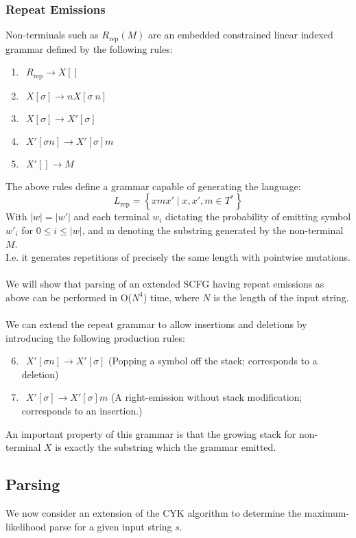 \documentclass[11pt]{article}
\begin{document}
\subsubsection {Repeat Emissions}
Non-terminals such as $R_\text{rep}(M)$ are an embedded constrained linear indexed grammar
defined by the following rules:
\begin{enumerate}
\item $\ \ R_\text{rep} \rightarrow X[]$
\item $\ \ X[\sigma] \rightarrow n X[\sigma \ n]$
\item $\ \ X[\sigma] \rightarrow X'[\sigma]$
\item $\ \ X'[\sigma n] \rightarrow X'[\sigma]m$
\item $\ \ X'[] \rightarrow M$
\end{enumerate}
The above rules define a grammar capable of generating the language:
\[
 L_\text{rep} = \left \{ xmx' \mid x,x',m \in T^* \right \}
\]
With $|w| = |w'|$ and each terminal $w_i$ dictating the probability of emitting symbol $w'_i$ for $0 \le i \le |w|$,
and m denoting the substring generated by the non-terminal $M$.\\
I.e. it generates repetitions of precisely the same length with pointwise mutations.\\ \\
We will show that parsing of an extended SCFG having repeat emissions as above can be performed in O($N^4$) time,
where $N$ is the length of the input string.\\ \\
We can extend the repeat grammar to allow insertions and deletions by introducing the following production rules:
\begin{enumerate}
\setcounter{enumi}{5}
\item $\ \ X'[\sigma n] \rightarrow X'[\sigma]$ (Popping a symbol off the stack; corresponds to a deletion)
\item $\ \ X'[\sigma] \rightarrow X'[\sigma]m$ (A right-emission without stack modification; corresponds to an insertion.)
\end{enumerate}
An important property of this grammar is that the growing stack for non-terminal $X$ is exactly the substring
which the grammar emitted.
\subsection {Parsing}
We now consider an extension of the CYK algorithm to determine the maximum-likelihood
parse for a given input string $s$. \\ \\
\end{document}
